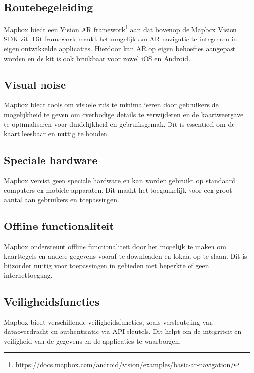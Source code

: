 \subsection*{Routebegeleiding}
Mapbox biedt een Vision AR framework\footnote{\url{https://docs.mapbox.com/android/vision/examples/basic-ar-navigation/}} aan dat bovenop de Mapbox Vision SDK zit. Dit framework maakt het mogelijk om AR-navigatie te integreren in eigen ontwikkelde applicaties. Hierdoor kan AR op eigen behoeftes aangepast worden en de kit is ook bruikbaar voor zowel iOS en Android.

\subsection*{Visual noise}
Mapbox biedt tools om visuele ruis te minimaliseren door gebruikers de mogelijkheid te geven om overbodige details te verwijderen en de kaartweergave te optimaliseren voor duidelijkheid en gebruiksgemak. Dit is essentieel om de kaart leesbaar en nuttig te houden.

\subsection*{Speciale hardware}
Mapbox vereist geen speciale hardware en kan worden gebruikt op standaard computers en mobiele apparaten. Dit maakt het toegankelijk voor een groot aantal aan gebruikers en toepassingen.

\subsection*{Offline functionaliteit}
Mapbox ondersteunt offline functionaliteit door het mogelijk te maken om kaarttegels en andere gegevens vooraf te downloaden en lokaal op te slaan. Dit is bijzonder nuttig voor toepassingen in gebieden met beperkte of geen internettoegang.


\subsection*{Veiligheidsfuncties}
Mapbox biedt verschillende veiligheidsfuncties, zoals versleuteling van dataoverdracht en authenticatie via API-sleutels. Dit helpt om de integriteit en veiligheid van de gegevens en de applicaties te waarborgen.


